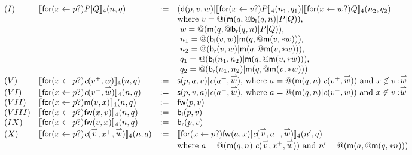 \documentclass[submission,copyright,creativecommons]{eptcs}
\makeatletter
\newcommand{\ldb}{[\![}
\newcommand{\rdb}{]\!]}
\newcommand{\binpar}[2]{#1 | #2}
\newcommand{\prefix}[3]{\mathsf{for}(#2 \leftarrow #1?) #3}
\newcommand{\quotep}[1]{\mathsf{@}#1}
\newcommand{\meaningof}[1]{\ldb #1 \rdb}
\newcommand{\vect}[1]{\stackrel{\rightharpoonup}{#1}}
\theoremstyle{definition}
\theoremstyle{remark}
\theoremstyle{remark}
\makeatother
\begin{document}
\[\begin{array}{llrl}
(I)&  \meaningof{\prefix{p}{x}{\binpar{P}{Q}}}_4(n, q) 
    & := & 
    (\mathsf{d}(p,v,w)|\binpar{\meaningof{\prefix{v}{x}{P}}_{4}(n_{1}, q_{1})}{\meaningof{\prefix{w}{x}{Q}}_{4}(n_{2}, q_{2}) } \\
& & & \mbox{where $v = \quotep{(\mathsf{m}(q,\quotep{\binpar{\mathsf{b}_{\mathsf{l}}(q,n)}{\binpar{P}{Q}}}))}$,} \\
& & & \mbox{     $w = \quotep{(\mathsf{m}(q,\quotep{\binpar{\mathsf{b}_{\mathsf{r}}(q,n)}{\binpar{P}{Q}}}))}$,} \\
& & &\mbox{     $n_{1} = \quotep{(\binpar{\mathsf{b}_{\mathsf{l}}(v,w)}{\mathsf{m}(q,\quotep{\mathsf{m}(v,*w)})})}$,} \\
& & &\mbox{     $n_{2} = \quotep{(\binpar{\mathsf{b}_{\mathsf{r}}(v,w)}{\mathsf{m}(q,\quotep{\mathsf{m}(v,*w)})})}$,} \\
& & &\mbox{     $q_{1} = \quotep{(\binpar{\mathsf{b}_{\mathsf{l}}(n_{1},n_{2})}{\mathsf{m}(q,\quotep{\mathsf{m}(v,*w)})})}$,} \\
& & & \mbox{     $q_{2} = \quotep{(\binpar{\mathsf{b}_{\mathsf{r}}(n_{1},n_{2})}{\mathsf{m}(q,\quotep{\mathsf{m}(v,*w)})})}$ }\\
(V)&  \meaningof{\prefix{p}{x}{\emph{c}(v^{+},w)}}_4(n, q) 
    & := & 
    \mathsf{s}(p,a,v)|\emph{c}(a^{+},\vect{w})
    \mbox{, where $a = @(\binpar{\mathsf{m}(q,n)}{\emph{c}(v^{+},\vect{w})})$ and $x \not\in v : \vect{w}$}\\
(VI)&  \meaningof{\prefix{p}{x}{\emph{c}(v^{-},\vect{w})}}_4(n, q) 
    & := & 
    \mathsf{s}(p,v,a)|\emph{c}(a^{-},\vect{w})
    \mbox{, where $a = @(\mathsf{m}(q,n)|\emph{c}(v^{-},w))$ and $x \not\in v : \vect{w}$} \\
(VII)&  \meaningof{\prefix{p}{x}{\mathsf{m}(v,x)}}_4(n, q) 
    & := & 
    \mathsf{fw}(p,v) \\
(VIII)&  \meaningof{\prefix{p}{x}{\mathsf{fw}(x,v)}}_4(n, q) 
    & := & 
    \mathsf{b}_{\mathsf{l}}(p,v) \\
(IX)&  \meaningof{\prefix{p}{x}{\mathsf{fw}(v,x)}}_4(n, q) 
    & := & 
    \mathsf{b}_{\mathsf{r}}(p,v) \\
(X)&  \meaningof{\prefix{p}{x}{\emph{c}(\vect{v},x^{+},\vect{w})}}_4(n, q) 
    & := & 
    \meaningof{\prefix{p}{x}{\binpar{\mathsf{fw}(a,x)}{\emph{c}(\vect{v},a^{+},\vect{w})}}}_4(n', q)\\
    & & & \mbox{where $a = @(\binpar{\mathsf{m}(q,n)}{\emph{c}(\vect{v},x^{+},\vect{w})})$} \mbox{ and $n'= \quotep{(\mathsf{m}(a,\quotep{\mathsf{m}(q,*n)}))}$} \\

\end{array}\]
\end{document}
